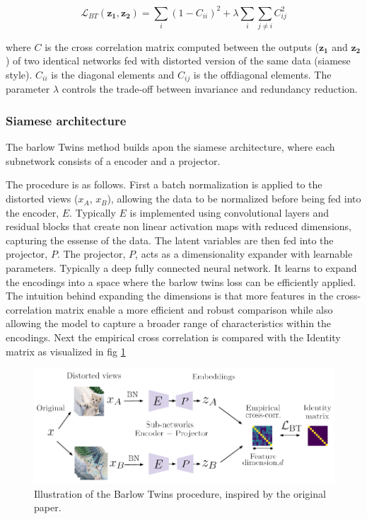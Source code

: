 \begin{equation}
\mathcal{L}_{BT}(\mathbf{z_1}, \mathbf{z_2}) = \sum_i (1 - C_{ii})^2 + \lambda \sum_i \sum_{j \neq i} C_{ij}^2
\end{equation}

where $C$ is the cross correlation matrix computed between the outputs ($\mathbf{z_1}$ and $\mathbf{z_2}$) of two identical networks fed with distorted version of the same data (siamese style). $C_{ii}$ is the diagonal elements and $C_{ij}$ is the offdiagonal elements.
The parameter $\lambda$ controls the trade-off between invariance and redundancy reduction.

\subsubsection{Siamese architecture}
The barlow Twins method builds apon the siamese architecture, where each subnetwork consists of a encoder and a projector.

The procedure is as follows. First a batch normalization is applied to the distorted views ($x_A$, $x_B$), allowing the data to be normalized before being fed into the encoder, $E$.
Typically $E$ is implemented using convolutional layers and residual blocks that create non linear activation maps with reduced dimensions, capturing the essense of the data. The latent variables are then fed into the projector, $P$.
The projector, $P$, acts as a dimensionality expander with learnable parameters. Typically a deep fully connected neural network. It learns to expand the encodings into a space where the barlow twins loss can be efficiently applied.
The intuition behind expanding the dimensions is that more features in the cross-correlation matrix enable a more efficient and robust comparison while also allowing the model to capture a broader range of characteristics within the encodings.
Next the empirical cross correlation is compared with the Identity matrix as visualized in fig \ref{fig:Barlow}

\begin{figure}[H]
    \includegraphics[scale=0.8]{figures/figure-pdf/BarlowT.pdf}
    \caption{Illustration of the Barlow Twins procedure, inspired by the original paper\cite{Barlow}.}
    \label{fig:Barlow}
\end{figure}

